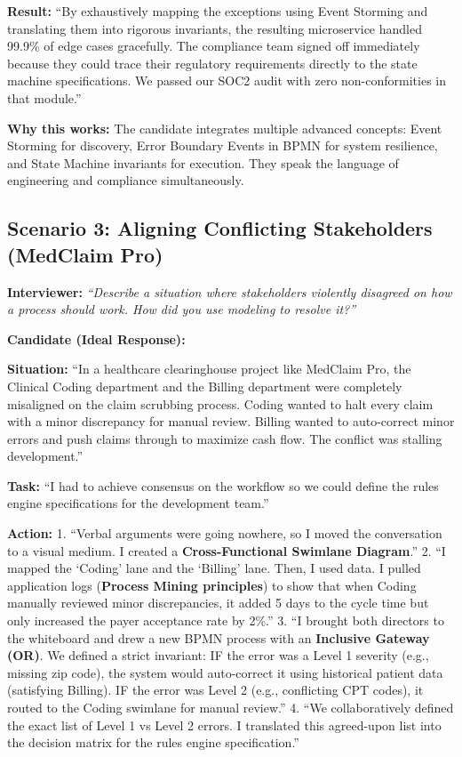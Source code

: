 \documentclass[
  11pt,
  openany,
  oneside]{book}
\renewenvironment{quote}{\begin{customquote}}{\end{customquote}}
\begin{document}
\textbf{Result:} ``By exhaustively mapping the exceptions using Event
Storming and translating them into rigorous invariants, the resulting
microservice handled 99.9\% of edge cases gracefully. The compliance
team signed off immediately because they could trace their regulatory
requirements directly to the state machine specifications. We passed our
SOC2 audit with zero non-conformities in that module.''

\begin{quote}
\textbf{Why this works:} The candidate integrates multiple advanced
concepts: Event Storming for discovery, Error Boundary Events in BPMN
for system resilience, and State Machine invariants for execution. They
speak the language of engineering and compliance simultaneously.
\end{quote}

\subsection{Scenario 3: Aligning Conflicting Stakeholders (MedClaim
Pro)}\label{scenario-3-aligning-conflicting-stakeholders-medclaim-pro}

\textbf{Interviewer:} \emph{``Describe a situation where stakeholders
violently disagreed on how a process should work. How did you use
modeling to resolve it?''}

\textbf{Candidate (Ideal Response):}

\textbf{Situation:} ``In a healthcare clearinghouse project like
MedClaim Pro, the Clinical Coding department and the Billing department
were completely misaligned on the claim scrubbing process. Coding wanted
to halt every claim with a minor discrepancy for manual review. Billing
wanted to auto-correct minor errors and push claims through to maximize
cash flow. The conflict was stalling development.''

\textbf{Task:} ``I had to achieve consensus on the workflow so we could
define the rules engine specifications for the development team.''

\textbf{Action:} 1. ``Verbal arguments were going nowhere, so I moved
the conversation to a visual medium. I created a
\textbf{Cross-Functional Swimlane Diagram}.'' 2. ``I mapped the `Coding'
lane and the `Billing' lane. Then, I used data. I pulled application
logs (\textbf{Process Mining principles}) to show that when Coding
manually reviewed minor discrepancies, it added 5 days to the cycle time
but only increased the payer acceptance rate by 2\%.'' 3. ``I brought
both directors to the whiteboard and drew a new BPMN process with an
\textbf{Inclusive Gateway (OR)}. We defined a strict invariant: IF the
error was a Level 1 severity (e.g., missing zip code), the system would
auto-correct it using historical patient data (satisfying Billing). IF
the error was Level 2 (e.g., conflicting CPT codes), it routed to the
Coding swimlane for manual review.'' 4. ``We collaboratively defined the
exact list of Level 1 vs Level 2 errors. I translated this agreed-upon
list into the decision matrix for the rules engine specification.''
\end{document}
